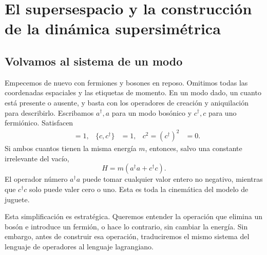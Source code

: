 \chapter{El supersespacio y la construcción de la dinámica supersimétrica}


\section{Volvamos al sistema de un modo}

Empecemos de nuevo con fermiones y bosones en reposo. Omitimos todas las coordenadas espaciales y las etiquetas de momento. En un modo dado, un cuanto está presente o ausente, y basta con los operadores de creación y aniquilación para describirlo. Escribamos \(a^\dagger,a\) para un modo bosónico y \(c^\dagger,c\) para uno fermiónico. Satisfacen
\begin{align}
[a,a^\dagger]&=1,
&
\{c,c^\dagger\}&=1,
&
c^2=(c^\dagger)^2&=0.
\end{align}
Si ambos cuantos tienen la misma energía \(m\), entonces, salvo una constante irrelevante del vacío,
\begin{equation}
H=m\left(a^\dagger a+c^\dagger c\right).
\label{eq:l7-one-mode-hamiltonian}
\end{equation}
El operador número \(a^\dagger a\) puede tomar cualquier valor entero no negativo, mientras que \(c^\dagger c\) solo puede valer cero o uno. Esta es toda la cinemática del modelo de juguete.

Esta simplificación es estratégica. Queremos entender la operación que elimina un bosón e introduce un fermión, o hace lo contrario, sin cambiar la energía. Sin embargo, antes de construir esa operación, traduciremos el mismo sistema del lenguaje de operadores al lenguaje lagrangiano.

